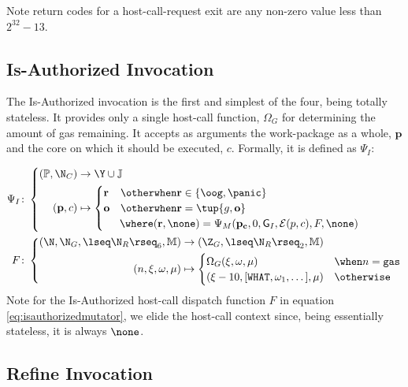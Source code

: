 Note return codes for a host-call-request exit are any non-zero value less than $2^{32} - 13$.

\subsection{Is-Authorized Invocation}\label{sec:isauthorizedinvocation}

The Is-Authorized invocation is the first and simplest of the four, being totally stateless. It provides only a single host-call function, $\Omega_G$ for determining the amount of gas remaining. It accepts as arguments the work-package as a whole, $\mathbf{p}$ and the core on which it should be executed, $c$. Formally, it is defined as $\Psi_I$:

\begin{align}
  \Psi_I &\colon \left\{\begin{aligned}
    (\mathbb{P}, \N_C) &\to \Y \cup \mathbb{J} \\
    (\mathbf{p}, c) &\mapsto \begin{cases}
      \mathbf{r} &\otherwhen \mathbf{r} \in \{ \oog, \panic \}  \\
      \mathbf{o} &\otherwhen \mathbf{r} = \tup{g, \mathbf{o}} \\
      \multicolumn{2}{l}{\quad\where (\mathbf{r}, \none) = \Psi_M(\mathbf{p}_\mathbf{c}, 0, \mathsf{G}_I, \mathcal{E}(p, c), F, \none)}
    \end{cases} \\
  \end{aligned}\right. \\
  \label{eq:isauthorizedmutator}F&\colon\left\{\begin{aligned}
    (\N, \N_G, \lseq\N_R\rseq_6, \mathbb{M}) &\to (\Z_G, \lseq\N_R\rseq_2, \mathbb{M})\\
    (n, \xi, \omega, \mu) &\mapsto \begin{cases}
      \Omega_G(\xi, \omega, \mu) &\when n = \mathtt{gas} \\
      (\xi - 10, [\mathtt{WHAT}, \omega_1, \dots], \mu) &\otherwise
    \end{cases}
  \end{aligned}
  \right.
\end{align}
Note for the Is-Authorized host-call dispatch function $F$ in equation \ref{eq:isauthorizedmutator}, we elide the host-call context since, being essentially stateless, it is always $\none$.

\subsection{Refine Invocation}\label{sec:refineinvocation}

